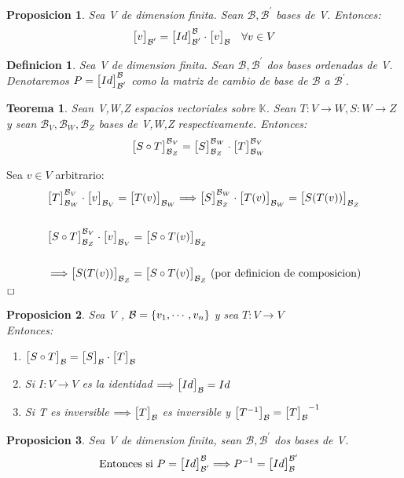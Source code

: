 \documentclass[]{article}
\newtheorem{theorem}{Teorema}
\newtheorem{proposition}{Proposicion}[theorem]
\newtheorem{definition}{Definicion}
\newenvironment{proof}{\noindent{\bf Prueba:}}{$\hfill \Box$ \vspace{10pt}}
\newcommand{\K}{
    \mathbb{K}
}
\newcommand{\ida}{\Longrightarrow}
\newcommand{\base}{\text{$\mathcal{B}$}}
\newcommand{\basep}{\text{$\mathcal{B}^{\prime}$}}
\begin{document}
\begin{proposition}
    Sea V \espvec de dimension finita. Sean $\base,\basep$ bases de V. Entonces:
    \begin{align*}
        \cbs{v}{\basep}{}=\cbs{Id}{\basep}{\base} \cdot \cbs{v}{\base}{} \quad \forall v \in V
    \end{align*}
\end{proposition}

\begin{definition}
    Sea V \espvec de dimension finita. Sean $\base,\basep$ dos bases ordenadas de V.
    Denotaremos $P=\cbs{Id}{\basep}{\base}$ como la matriz de cambio de base de $\base$ a $\basep$. 
\end{definition}

\begin{theorem}
    Sean V,W,Z espacios vectoriales sobre $\K$. Sean $T:V\to W, S:W\to Z$ \tl y sean
    $\base_V,\base_W,\base_Z$ bases de V,W,Z respectivamente. Entonces:
    \begin{align*}
        &\cbs{S \circ T}{\base_Z}{\base_V}=\cbs{S}{\base_Z}{\base_W} \cdot \cbs{T}{\base_W}{\base_V} 
    \end{align*}
\end{theorem}
\begin{proof}
    Sea $v \in V$ arbitrario:
    \begin{align*}
        &\cbs{T}{\base_W}{\base_V} \cdot \cbs{v}{\base_V}{} = \cbs{\T{v}}{\base_W}{}
        \ida \cbs{S}{\base_Z}{\base_W} \cdot \cbs{\T{v}}{\base_W}{} = \cbs{S(\T{v})}{\base_Z}{}\\\\
        &\cbs{S \circ T}{\base_Z}{\base_V} \cdot  \cbs{v}{\base_V}{} = \cbs{S \circ \T{v}}{\base_Z}{}\\\\
        &\ida \cbs{S(\T{v})}{\base_Z}{} = \cbs{S \circ \T{v}}{\base_Z}{} \text{ (por definicion de composicion)}
    \end{align*}
\end{proof}
\newpage
\begin{proposition}
    Sea V \espvec , $\base = \conjunto{v_1,\cdots,v_n}$ y sea $T:V\to V$ \tl\\
    Entonces:
    \begin{enumerate}
        \item $\cbs{S\circ T}{\base}{}=\cbs{S}{\base}{} \cdot \cbs{T}{\base}{}$
        \item Si $I:V\to V$ es la identidad $\ida \cbs{Id}{\base}{}=Id$
        \item Si T es inversible $\ida \cbs{T}{\base}{}$ es inversible y
        $\cbs{T^{-1}}{\base}{}=\cbs{T}{\base}{}^{-1}$
    \end{enumerate}
\end{proposition}
\begin{proposition}
    Sea V \espvec de dimension finita, sean $\base,\basep$ dos bases de V.
    \begin{align*}
        &\text{Entonces si } P=\cbs{Id}{\basep}{\base} \ida P^{-1}=\cbs{Id}{\base}{\basep}
    \end{align*}
\end{proposition}
\end{document}
